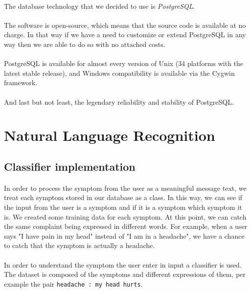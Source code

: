 \paragraph{}
The database technology that we decided to use is \textit{PostgreSQL}\cite{bib:misc:1}.
\paragraph{}
The software is open-source, which means that the source code is available at no charge. In that way if we have a need to customize or extend PostgreSQL in any way then we are able to do so with no attached costs.
\paragraph{}
PostgreSQL is available for almost every version of Unix (34 platforms with the latest stable release), and Windows compatibility is available via the Cygwin framework.
\paragraph{}
And last but not least, the legendary reliability and stability of PostgreSQL.

\section{Natural Language Recognition}

\subsection{Classifier implementation}

\paragraph{}
In	order	to	process	the	symptom	from	the	user	as	a	meaningful	message	text,	we	treat	each	symptom	stored	in	our	database	as	a	class.	In	this	way,	we	can	see	if	the	input	from	the	user	is	a	symptom	and	if	it	is	a	symptom	which	symptom	it	is.	We	created	some	training	data	for	each	symptom.	At	this	point,	we	can	catch	the	same	complaint	being	expressed	in	different	words.	For	example,	when	a	user	says	"I	have	pain	in	my	head"	instead	of	"I	am	in	a	headache",	we	have	a	chance	to	catch	that	the	symptom	is	actually	a	headache.	

\paragraph{}
In order to understand the symptom the user enter in input a classifier is used. The dataset is composed of the symptoms and different expressions of them, per example the pair \texttt{headache : my head hurts}.

